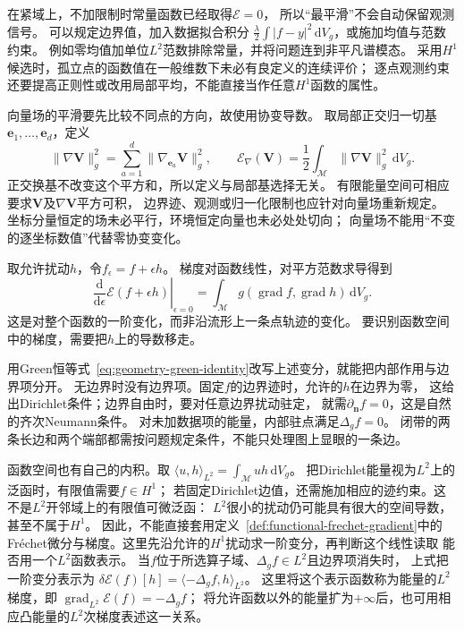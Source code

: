 在紧域上，不加限制时常量函数已经取得$\mathcal E=0$，
所以“最平滑”不会自动保留观测信号。
可以规定边界值，加入数据拟合积分
$\frac{\lambda}{2}\int|f-y|^2\,\mathrm dV_g$，或施加均值与范数约束。
例如零均值加单位$L^2$范数排除常量，并将问题连到非平凡谱模态。
采用$H^1$候选时，孤立点的函数值在一般维数下未必有良定义的连续评价；
逐点观测约束还要提高正则性或改用局部平均，不能直接当作任意$H^1$函数的属性。

向量场的平滑要先比较不同点的方向，故使用协变导数。
取局部正交归一切基$\bm e_1,\ldots,\bm e_d$，定义
\[
 \lVert\nabla\bm V\rVert_g^2
 =\sum_{a=1}^d\lVert\nabla_{\bm e_a}\bm V\rVert_g^2,\qquad
 \mathcal E_\nabla(\bm V)
 =\frac12\int_{\mathcal M}\lVert\nabla\bm V\rVert_g^2\,\mathrm dV_g.
\]
正交换基不改变这个平方和，所以定义与局部基选择无关。
有限能量空间可相应要求$\bm V$及$\nabla\bm V$平方可积，
边界迹、观测或归一化限制也应针对向量场重新规定。
坐标分量恒定的场未必平行，环境恒定向量也未必处处切向；
向量场不能用“不变的逐坐标数值”代替零协变变化。


取允许扰动$h$，令$f_\epsilon=f+\epsilon h$。
梯度对函数线性，对平方范数求导得到
\begin{equation}
 \left.\frac{\mathrm d}{\mathrm d\epsilon}
  \mathcal E(f+\epsilon h)\right|_{\epsilon=0}
 =\int_{\mathcal M}
    g(\operatorname{grad}f,\operatorname{grad}h)\,\mathrm dV_g.
 \label{eq:geometry-dirichlet-first-variation}
\end{equation}
这是对整个函数的一阶变化，而非沿流形上一条点轨迹的变化。
要识别函数空间中的梯度，需要把$h$上的导数移走。


用Green恒等式~\eqref{eq:geometry-green-identity}改写上述变分，就能把内部作用与边界项分开。
无边界时没有边界项。固定$f$的边界迹时，允许的$h$在边界为零，
这给出Dirichlet条件；边界自由时，要对任意边界扰动驻定，
就需$\partial_{\bm n}f=0$，这是自然的齐次Neumann条件。
对未加数据项的能量，内部驻点满足$\Delta_gf=0$。
闭带的两条长边和两个端部都需按问题规定条件，不能只处理图上显眼的一条边。

函数空间也有自己的内积。取
$\langle u,h\rangle_{L^2}=\int_{\mathcal M}uh\,\mathrm dV_g$。
把Dirichlet能量视为$L^2$上的泛函时，有限值需要$f\in H^1$；
若固定Dirichlet边值，还需施加相应的迹约束。这不是$L^2$开邻域上的有限值可微泛函：
$L^2$很小的扰动仍可能具有很大的空间导数，甚至不属于$H^1$。
因此，不能直接套用定义~\ref{def:functional-frechet-gradient}中的
Fréchet微分与梯度。这里先沿允许的$H^1$扰动求一阶变分，再判断这个线性读取
能否用一个$L^2$函数表示。
当$f$位于所选算子域、$\Delta_gf\in L^2$且边界项消失时，
上式把一阶变分表示为
$\delta\mathcal E(f)[h]=\langle-\Delta_gf,h\rangle_{L^2}$。
这里将这个表示函数称为能量的$L^2$梯度，即
$\operatorname{grad}_{L^2}\mathcal E(f)=-\Delta_gf$；
将允许函数以外的能量扩为$+\infty$后，也可用相应凸能量的$L^2$次梯度表述这一关系。


